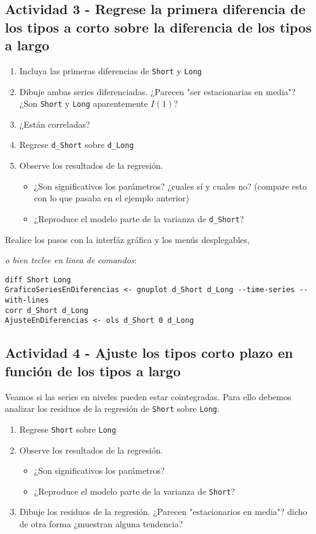 \documentclass[11pt]{article}
\begin{document}
\vspace{-3pt}

\subsection{Actividad 3 - Regrese la primera diferencia de los tipos a corto sobre la diferencia de los tipos a largo}
\label{sec:orgcdc0785}
\begin{enumerate}
\item Incluya las primeras diferencias de \texttt{Short} y \texttt{Long}
\item Dibuje ambas series diferenciadas. ¿Parecen "ser estacionarias en
media"? ¿Son \texttt{Short} y \texttt{Long} aparentemente \(I(1)?\)
\item ¿Están correladas?
\item Regrese \texttt{d\_Short} sobre \texttt{d\_Long}
\item Observe los resultados de la regresión.
\begin{itemize}
\item ¿Son significativos los parámetros? ¿cuales sí y cuales no?
(compare esto con lo que pasaba en el ejemplo anterior)
\item ¿Reproduce el modelo parte de la varianza de \texttt{d\_Short}?
\end{itemize}
\end{enumerate}

Realice los pasos con la interfáz gráfica y los menús desplegables,
{\vspace{0pt} \footnotesize \color{gray!70!black}
\emph{o bien teclee en linea de comandos}:
\begin{verbatim}
diff Short Long
GraficoSeriesEnDiferencias <- gnuplot d_Short d_Long --time-series --with-lines
corr d_Short d_Long
AjusteEnDiferencias <- ols d_Short 0 d_Long
\end{verbatim}
}

\subsection{Actividad 4 - Ajuste los tipos corto plazo en función de los tipos a largo}
\label{sec:org70bb74e}

Veamos si las series en niveles pueden estar cointegradas. Para ello
debemos analizar los residuos de la regresión de \texttt{Short} sobre
\texttt{Long}.

\begin{enumerate}
\item Regrese \texttt{Short} sobre \texttt{Long}
\item Observe los resultados de la regresión.
\begin{itemize}
\item ¿Son significativos los parámetros?
\item ¿Reproduce el modelo parte de la varianza de \texttt{Short}?
\end{itemize}
\item Dibuje los residuos de la regresión. ¿Parecen "estacionarios en
media"? dicho de otra forma ¿muestran alguna tendencia?
\end{enumerate}
\end{document}

